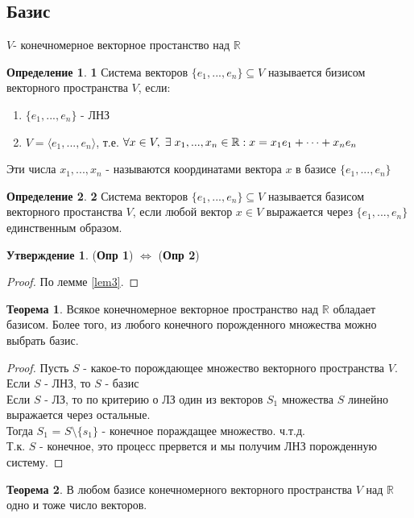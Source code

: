 \documentclass[a4paper, 12pt]{article}
\newcommand{\R}{\mathbb R}
\newcommand\tab[1][.5cm]{\hspace*{#1}}
\theoremstyle{definition}
\newtheorem*{definition}{Определение}
\newtheorem*{theorem}{Теорема}
\newtheorem*{subtheorem}{Утверждение}
\begin{document}
\subsection{Базис}
$V$- конечномерное векторное простанство над $\R$ 
\begin{definition}\tab[-0.1cm]\textbf{1} 
  Система векторов $\{e_1,...,e_n\}\subseteq V$ называется бизисом векторного пространства $V$, если:
  \begin{enumerate}
    \item $\{e_1,...,e_n\}$ - ЛНЗ
    \item $V = \langle e_1,...,e_n \rangle$, т.е. $\forall x \in V, \tab[0.1cm] \exists \tab[0.1cm] x_1,...,x_n \in \R: x = x_1e_1+\cdots + x_ne_n$  
  \end{enumerate}
  Эти числа $x_1,...,x_n$ - называются координатами вектора $x$ в базисе $\{e_1,...,e_n\}$ 
\end{definition} 
\begin{definition}\tab[-0.1cm]\textbf{2} 
  Система векторов $\{e_1,...,e_n\} \subseteq V$ называется базисом векторного простанства $V$, если любой вектор $x \in V$ выражается через $\{e_1,...,e_n\}$ единственным образом.
\end{definition} 
  \begin{subtheorem}
    (\textbf{Опр 1}) $\Longleftrightarrow $ (\textbf{Опр 2})
  \end{subtheorem} 
  \begin{proof}
    По лемме \eqref{lem3}.
  \end{proof}
  \begin{theorem}
    Всякое конечномерное векторное пространство над $\R$ обладает базисом. Более того, из любого конечного порожденного множества можно выбрать базис.
  \end{theorem} 
  \begin{proof}
    Пусть $S$ - какое-то порождающее множество векторного пространства $V$. \\
    Если $S$ - ЛНЗ, то $S$ - базис \\
    Если $S$ - ЛЗ, то по критерию о ЛЗ один из векторов $S_1$ множества $S$ линейно выражается через остальные. \\
    Тогда $S_1$ = $S\setminus\{s_1\}$ - конечное пораждащее множество. ч.т.д. \\
    Т.к. $S$ - конечное, это процесс прервется и мы получим ЛНЗ порожденную систему.
  \end{proof} 
  \begin{theorem}
    В любом базисе конечномерного векторного пространства $V$ над $\R$ одно и тоже число векторов.
  \end{theorem} 
\end{document}
